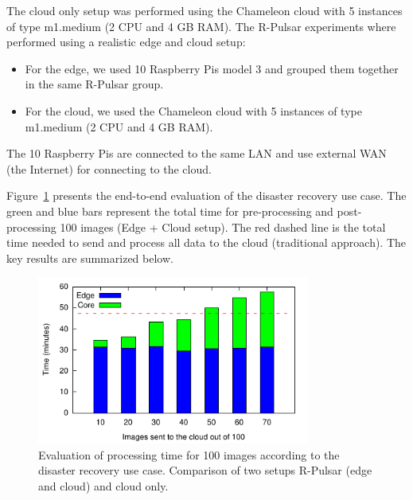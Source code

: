 
The cloud only setup was performed using the Chameleon cloud with 5 instances of type m1.medium (2 CPU and 4 GB RAM). The R-Pulsar experiments where performed using a realistic edge and cloud setup:

\begin{itemize}
\item For the edge, we used 10 Raspberry Pis model 3 and grouped them together in the same R-Pulsar group.
\item For the cloud, we used the Chameleon cloud with 5 instances of type m1.medium (2 CPU and 4 GB RAM).
\end{itemize}

The 10 Raspberry Pis are connected to the same LAN and use external WAN (the Internet) for connecting to the cloud.

Figure~\ref{fig:EndToEnd} presents the end-to-end evaluation of the disaster recovery use case. The green and blue bars represent the total time for pre-processing and post-processing 100 images (Edge + Cloud setup). The red dashed line is the total time needed to send and process all data to the cloud (traditional approach). The key results are summarized below. 

\begin{figure}[h!]
  \includegraphics[width=0.8\textwidth]{Results/EndToEndBar.pdf}
  \caption{Evaluation of processing time for 100 images according to the disaster recovery use case. Comparison of two setups R-Pulsar (edge and cloud) and cloud only.}
  \label{fig:EndToEnd}
\end{figure}

